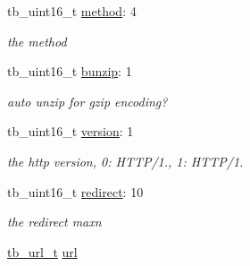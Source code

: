 \begin{DoxyCompactItemize}
\item 
\hypertarget{structtb__http__option__t_ad5ccb4bcb39411c6338dbc74b4f08050}{tb\-\_\-uint16\-\_\-t \hyperlink{structtb__http__option__t_ad5ccb4bcb39411c6338dbc74b4f08050}{method}\-: 4}\label{structtb__http__option__t_ad5ccb4bcb39411c6338dbc74b4f08050}

\begin{DoxyCompactList}\small\item\em the method \end{DoxyCompactList}\item 
\hypertarget{structtb__http__option__t_a06bb7272f2e3ce2b4243aebdecb96fa6}{tb\-\_\-uint16\-\_\-t \hyperlink{structtb__http__option__t_a06bb7272f2e3ce2b4243aebdecb96fa6}{bunzip}\-: 1}\label{structtb__http__option__t_a06bb7272f2e3ce2b4243aebdecb96fa6}

\begin{DoxyCompactList}\small\item\em auto unzip for gzip encoding? \end{DoxyCompactList}\item 
\hypertarget{structtb__http__option__t_ad3fa1772a86526024d4ce550c9a08ae9}{tb\-\_\-uint16\-\_\-t \hyperlink{structtb__http__option__t_ad3fa1772a86526024d4ce550c9a08ae9}{version}\-: 1}\label{structtb__http__option__t_ad3fa1772a86526024d4ce550c9a08ae9}

\begin{DoxyCompactList}\small\item\em the http version, 0\-: H\-T\-T\-P/1., 1\-: H\-T\-T\-P/1. \end{DoxyCompactList}\item 
\hypertarget{structtb__http__option__t_a5094ed68221b7e5a690a71278991b013}{tb\-\_\-uint16\-\_\-t \hyperlink{structtb__http__option__t_a5094ed68221b7e5a690a71278991b013}{redirect}\-: 10}\label{structtb__http__option__t_a5094ed68221b7e5a690a71278991b013}

\begin{DoxyCompactList}\small\item\em the redirect maxn \end{DoxyCompactList}\item 
\hypertarget{structtb__http__option__t_a7d87f0909227f7c939e8d13ec2bdf75e}{\hyperlink{structtb__url__t}{tb\-\_\-url\-\_\-t} \hyperlink{structtb__http__option__t_a7d87f0909227f7c939e8d13ec2bdf75e}{url}}\label{structtb__http__option__t_a7d87f0909227f7c939e8d13ec2bdf75e}


\end{DoxyCompactItemize}
